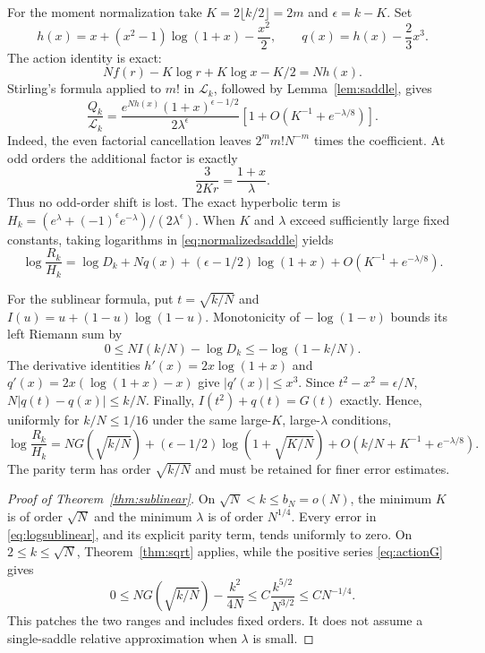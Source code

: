 For the moment normalization take $K=2\lfloor k/2\rfloor=2m$ and $\epsilon=k-K$. Set
\begin{equation}\label{eq:actionq}
h(x)=x+(x^2-1)\log(1+x)-\frac{x^2}{2},\qquad
q(x)=h(x)-\frac23x^3.
\end{equation}
The action identity is exact:
\[
Nf(r)-K\log r+K\log x-K/2=Nh(x).
\]
Stirling's formula applied to $m!$ in $\mathcal L_k$, followed by Lemma~\ref{lem:saddle}, gives
\begin{equation}\label{eq:normalizedsaddle}
\frac{Q_k}{\mathcal L_k}
=\frac{e^{Nh(x)}(1+x)^{\epsilon-1/2}}{2\lambda^\epsilon}
\left[1+O\left(K^{-1}+e^{-\lambda/8}\right)\right].
\end{equation}
Indeed, the even factorial cancellation leaves $2^mm!N^{-m}$ times the coefficient. At odd orders the additional factor is exactly
\[
\frac3{2Kr}=\frac{1+x}{\lambda}.
\]
Thus no odd-order shift is lost. The exact hyperbolic term is
$H_k=(e^\lambda+(-1)^\epsilon e^{-\lambda})/(2\lambda^\epsilon)$.
When $K$ and $\lambda$ exceed sufficiently large fixed constants, taking logarithms in \eqref{eq:normalizedsaddle} yields
\begin{equation}\label{eq:logsaddle}
\log\frac{R_k}{H_k}
=\log D_k+Nq(x)+(\epsilon-1/2)\log(1+x)
+O\left(K^{-1}+e^{-\lambda/8}\right).
\end{equation}

For the sublinear formula, put $t=\sqrt{k/N}$ and
$I(u)=u+(1-u)\log(1-u)$. Monotonicity of $-\log(1-v)$ bounds its left Riemann sum by
\begin{equation}\label{eq:denominatorintegral}
0\le NI(k/N)-\log D_k\le-\log(1-k/N).
\end{equation}
The derivative identities
$h'(x)=2x\log(1+x)$ and $q'(x)=2x(\log(1+x)-x)$ give $|q'(x)|\le x^3$. Since $t^2-x^2=\epsilon/N$,
$N|q(t)-q(x)|\le k/N$. Finally, $I(t^2)+q(t)=G(t)$ exactly. Hence, uniformly for $k/N\le1/16$ under the same large-$K$, large-$\lambda$ conditions,
\begin{equation}\label{eq:logsublinear}
\log\frac{R_k}{H_k}
=NG(\sqrt{k/N})+(\epsilon-1/2)\log(1+\sqrt{K/N})
+O\left(k/N+K^{-1}+e^{-\lambda/8}\right).
\end{equation}
The parity term has order $\sqrt{k/N}$ and must be retained for finer error estimates.

\begin{proof}[Proof of Theorem~\ref{thm:sublinear}]
On $\sqrt N<k\le b_N=o(N)$, the minimum $K$ is of order $\sqrt N$ and the minimum $\lambda$ is of order $N^{1/4}$. Every error in \eqref{eq:logsublinear}, and its explicit parity term, tends uniformly to zero. On $2\le k\le\sqrt N$, Theorem~\ref{thm:sqrt} applies, while the positive series \eqref{eq:actionG} gives
\[
0\le NG(\sqrt{k/N})-\frac{k^2}{4N}
\le C\frac{k^{5/2}}{N^{3/2}}\le CN^{-1/4}.
\]
This patches the two ranges and includes fixed orders. It does not assume a single-saddle relative approximation when $\lambda$ is small.
\end{proof}

